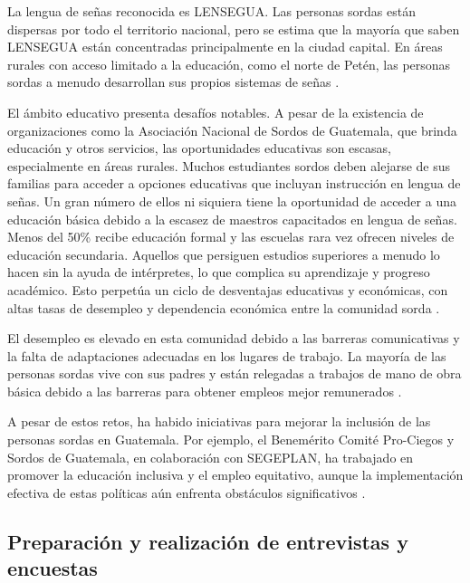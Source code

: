 La lengua de señas reconocida es LENSEGUA. Las personas sordas están dispersas por todo el territorio nacional, pero se estima que la mayoría que saben LENSEGUA están concentradas principalmente en la ciudad capital. En áreas rurales con acceso limitado a la educación, como el norte de Petén, las personas sordas a menudo desarrollan sus propios sistemas de señas \cite{JoshuaProject}. 

El ámbito educativo presenta desafíos notables. A pesar de la existencia de organizaciones como la Asociación Nacional de Sordos de Guatemala, que brinda educación y otros servicios, las oportunidades educativas son escasas, especialmente en áreas rurales. Muchos estudiantes sordos deben alejarse de sus familias para acceder a opciones educativas que incluyan instrucción en lengua de señas. Un gran número de ellos ni siquiera tiene la oportunidad de acceder a una educación básica debido a la escasez de maestros capacitados en lengua de señas. Menos del 50\% recibe educación formal y las escuelas rara vez ofrecen niveles de educación secundaria. Aquellos que persiguen estudios superiores a menudo lo hacen sin la ayuda de intérpretes, lo que complica su aprendizaje y progreso académico. Esto perpetúa un ciclo de desventajas educativas y económicas, con altas tasas de desempleo y dependencia económica entre la comunidad sorda \cite{EndangeredLanguages}.

El desempleo es elevado en esta comunidad debido a las barreras comunicativas y la falta de adaptaciones adecuadas en los lugares de trabajo. La mayoría de las personas sordas vive con sus padres y están relegadas a trabajos de mano de obra básica debido a las barreras para obtener empleos mejor remunerados \cite{EndangeredLanguages}.

A pesar de estos retos, ha habido iniciativas para mejorar la inclusión de las personas sordas en Guatemala. Por ejemplo, el Benemérito Comité Pro-Ciegos y Sordos de Guatemala, en colaboración con SEGEPLAN, ha trabajado en promover la educación inclusiva y el empleo equitativo, aunque la implementación efectiva de estas políticas aún enfrenta obstáculos significativos \cite{GobiernoGuatemala2022}.


\subsection{Preparación y realización de entrevistas y encuestas}


